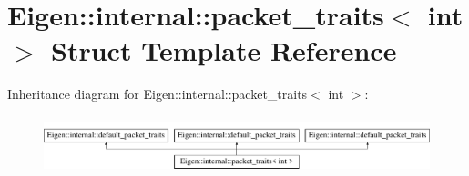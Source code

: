 \hypertarget{struct_eigen_1_1internal_1_1packet__traits_3_01int_01_4}{}\section{Eigen\+::internal\+::packet\+\_\+traits$<$ int $>$ Struct Template Reference}
\label{struct_eigen_1_1internal_1_1packet__traits_3_01int_01_4}
Inheritance diagram for Eigen\+::internal\+::packet\+\_\+traits$<$ int $>$\+:\begin{figure}[H]
\begin{center}
\leavevmode
\includegraphics[height=1.681682cm]{struct_eigen_1_1internal_1_1packet__traits_3_01int_01_4}
\end{center}
\end{figure}
